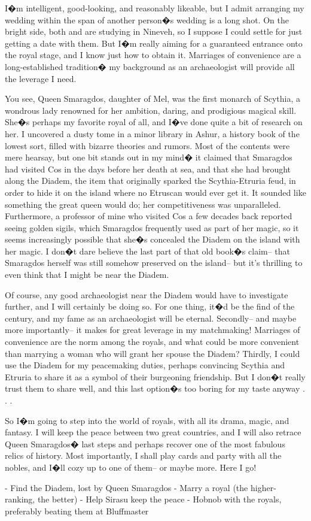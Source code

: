\documentclass[char]{Kos}
\begin{document}
I�m intelligent, good-looking, and reasonably likeable, but I admit arranging my wedding within the span of another person�s wedding is a long shot. On the bright side, both \cPoet{\nickname} and \cWard{\nickname} are studying in Nineveh, so I suppose I could settle for just getting a date with them. But I�m really aiming for a guaranteed entrance onto the royal stage, and I know just how to obtain it. Marriages of convenience are a long-established tradition� my background as an archaeologist will provide all the leverage I need.

You see, Queen Smaragdos, daughter of Mel, was the first monarch of Scythia, a wondrous lady renowned for her ambition, daring, and prodigious magical skill. She�s perhaps my favorite royal of all, and I�ve done quite a bit of research on her. I uncovered a dusty tome in a minor library in Ashur, a history book of the lowest sort, filled with bizarre theories and rumors. Most of the contents were mere hearsay, but one bit stands out in my mind� it claimed that Smaragdos had visited Cos in the days before her death at sea, and that she had brought along the Diadem, the item that originally sparked the Scythia-Etruria feud, in order to hide it on the island where no Etruscan would ever get it. It sounded like something the great queen would do; her competitiveness was unparalleled. Furthermore, a professor of mine who visited Cos a few decades back reported seeing golden sigils, which Smaragdos frequently used as part of her magic, so it seems increasingly possible that she�s concealed the Diadem on the island with her magic. I don�t dare believe the last part of that old book�s claim-- that Smaragdos herself was still somehow preserved on the island-- but it's thrilling to even think that I might be near the Diadem.

Of course, any good archaeologist near the Diadem would have to investigate further, and I will certainly be doing so. For one thing, it�d be the find of the century, and my fame as an archaeologist will be eternal. Secondly-- and maybe more importantly-- it makes for great leverage in my matchmaking! Marriages of convenience are the norm among the royals, and what could be more convenient than marrying a woman who will grant her spouse the Diadem? Thirdly, I could use the Diadem for my peacemaking duties, perhaps convincing Scythia and Etruria to share it as a symbol of their burgeoning friendship. But I don�t really trust them to share well, and this last option�s too boring for my taste anyway . . .

So I�m going to step into the world of royals, with all its drama, magic, and fantasy. I will keep the peace between two great countries, and I will also retrace Queen Smaragdos� last steps and perhaps recover one of the most fabulous relics of history. Most importantly, I shall play cards and party with all the nobles, and I�ll cozy up to one of them-- or maybe more. Here I go!

- Find the Diadem, lost by Queen Smaragdos
- Marry a royal (the higher-ranking, the better)
- Help Sirasu keep the peace
- Hobnob with the royals, preferably beating them at Bluffmaster
\end{document}
